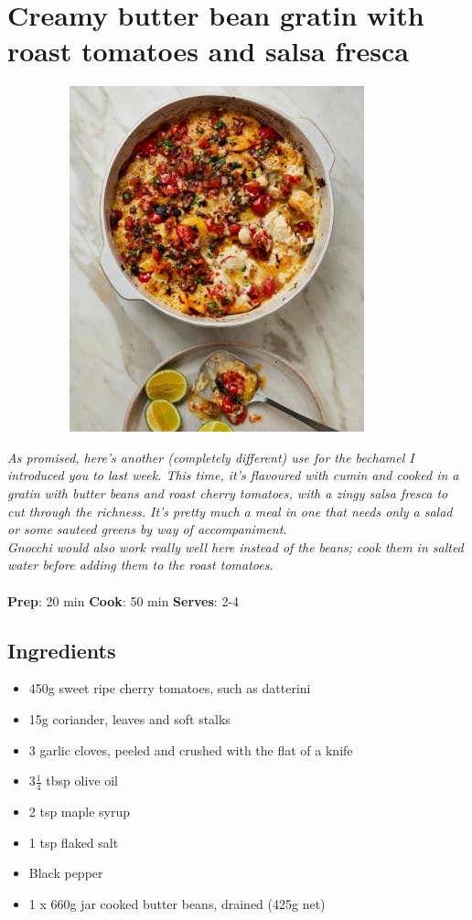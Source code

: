 \documentclass{book}
\begin{document}
\section{Creamy butter bean gratin with roast tomatoes and salsa fresca}
\begin{figure}
\centering\includegraphics[width=10cm,height=10cm,keepaspectratio]{Recipe_Pictures/Creamy_butter_bean_gratin_with_roast_tomatoes_and_salsa_fresca.png}
\end{figure}
\emph{As promised, here’s another (completely different) use for the bechamel I introduced you to last week. This time, it’s flavoured with cumin and cooked in a gratin with butter beans and roast cherry tomatoes, with a zingy salsa fresca to cut through the richness. It’s pretty much a meal in one that needs only a salad or some sauteed greens by way of accompaniment. \\ 
Gnocchi would also work really well here instead of the beans; cook them in salted water before adding them to the roast tomatoes.}\\\\ 
\textbf{Prep}: 20 min
\textbf{Cook}: 50 min
\textbf{Serves}: 2-4
\subsection*{Ingredients}
\begin{itemize}
\item 450g sweet ripe cherry tomatoes, such as datterini
\item 15g coriander, leaves and soft stalks
\item 3 garlic cloves, peeled and crushed with the flat of a knife
\item 3$\frac{1}{4}$ tbsp olive oil
\item 2 tsp maple syrup 
\item 1 tsp flaked salt
\item Black pepper
\item 1 x 660g jar cooked butter beans, drained (425g net)
\end{itemize}
\end{document}
